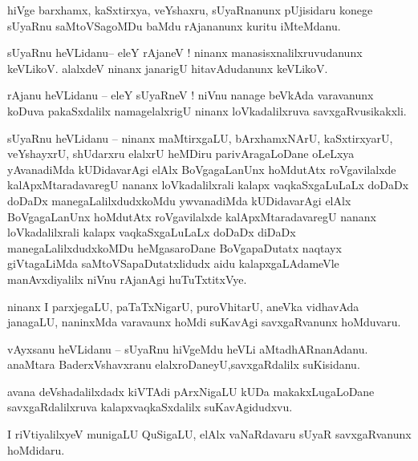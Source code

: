 \documentclass{article}
\begin{document}
\begin{mng}%
hiVge barxhamx, kaSxtirxya, veYshaxru, sUyaRnanunx pUjisidaru konege sUyaRnu saMtoVSagoMDu baMdu 
rAjananunx kuritu iMteMdanu.
\end{mng}

\begin{mng}%
sUyaRnu heVLidanu-- eleY rAjaneV ! ninanx manasisxnalilxruvudanunx keVLikoV. alalxdeV ninanx 
janarigU hitavAdudanunx keVLikoV.
\end{mng}

\begin{mng}%
rAjanu heVLidanu -- eleY sUyaRneV ! niVnu nanage beVkAda varavanunx koDuva pakaSxdalilx 
namagelalxrigU ninanx loVkadalilxruva savxgaRvusikakxli.
\end{mng}

\begin{mng}%
sUyaRnu heVLidanu -- ninanx maMtirxgaLU, bArxhamxNArU, kaSxtirxyarU, veYshayxrU, shUdarxru elalxrU 
heMDiru parivAragaLoDane oLeLxya yAvanadiMda kUDidavarAgi elAlx BoVgagaLanUnx hoMdutAtx 
roVgavilalxde kalApxMtaradavaregU nananx loVkadalilxrali kalapx vaqkaSxgaLuLaLx doDaDx doDaDx 
manegaLalilxdudxkoMdu ywvanadiMda kUDidavarAgi elAlx BoVgagaLanUnx hoMdutAtx roVgavilalxde 
kalApxMtaradavaregU nananx loVkadalilxrali kalapx vaqkaSxgaLuLaLx doDaDx diDaDx 
manegaLalilxdudxkoMDu heMgasaroDane BoVgapaDutatx naqtayx giVtagaLiMda saMtoVSapaDutatxlidudx 
aidu kalapxgaLAdameVle manAvxdiyalilx niVnu rAjanAgi huTuTxtitxVye.
\end{mng}

\begin{mng}%
ninanx I parxjegaLU, paTaTxNigarU, puroVhitarU, aneVka vidhavAda janagaLU, naninxMda varavaunx 
hoMdi suKavAgi savxgaRvanunx hoMduvaru.
\end{mng}

\begin{mng}%
vAyxsanu heVLidanu -- sUyaRnu hiVgeMdu heVLi aMtadhARnanAdanu. anaMtara BaderxVshavxranu 
elalxroDaneyU,savxgaRdalilx suKisidanu.
\end{mng}

\begin{mng}%
avana deVshadalilxdadx kiVTAdi pArxNigaLU kUDa makakxLugaLoDane savxgaRdalilxruva 
kalapxvaqkaSxdalilx suKavAgidudxvu.
\end{mng}

\begin{mng}%
I riVtiyalilxyeV munigaLU QuSigaLU, elAlx vaNaRdavaru sUyaR savxgaRvanunx hoMdidaru.
\end{mng}
\end{document}
